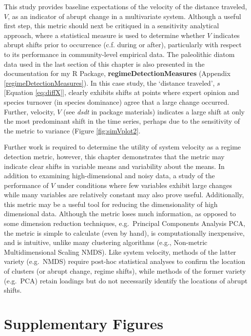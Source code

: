 \documentclass[print]{nuthesis}
\begin{document}
This study provides baseline expectations of the velocity of the distance traveled, \(V\), as an indicator of abrupt change in a multivariate system. Although a useful first step, this metric should next be critiqued in a sensitivity analytical approach, where a statistical measure is used to determine whether \(V\) indicates abrupt shifts prior to occurrence (c.f. during or after), particularly with respect to its performance in community-level empirical data. The paleolithic diatom data used in the last section of this chapter is also presented in the documentation for my R Package, \textbf{regimeDetectionMeasures} (Appendix \ref{regimeDetectionMeasures}). In this case study, the `distance traveled', \(s\) {[}Equation \eqref{eq:diffX}{]}, clearly exhibits shifts at points where expert opinion and species turnover (in species dominance) agree that a large change occurred. Further, velocity, \(V\) (see \emph{dsdt} in package materials) indicates a large shift at only the most predominant shift in the time series, perhaps due to the sensitivity of the metric to variance (Figure \ref{fig:simVplot2}.

Further work is required to determine the utility of system velocity as a regime detection metric, however, this chapter demonstrates that the metric may indicate clear shifts in variable means and variability about the means. In addition to examining high-dimensional and noisy data, a study of the performance of \(V\) under conditions where few variables exhibit large changes while many variables are relatively constant may also prove useful. Additionally, this metric may be a useful tool for reducing the dimensionality of high dimensional data. Although the metric loses much information, as opposed to some dimension reduction techniques, e.g.~Principal Components Analysis PCA, the metric is simple to calculate (even by hand), is computationally inexpensive, and is intuitive, unlike many clustering algorithms (e.g., Non-metric Multidimensional Scaling NMDS). Like system velocity, methods of the latter variety (e.g.~NMDS) require post-hoc statistical analyses to confirm the location of clusters (or abrupt change, regime shifts), while methods of the former variety (e.g.~PCA) retain loadings but do not necessarily identify the locations of abrupt shifts.

\hypertarget{supplementary-figures}{%
\section{Supplementary Figures}\label{supplementary-figures}}
\end{document}
